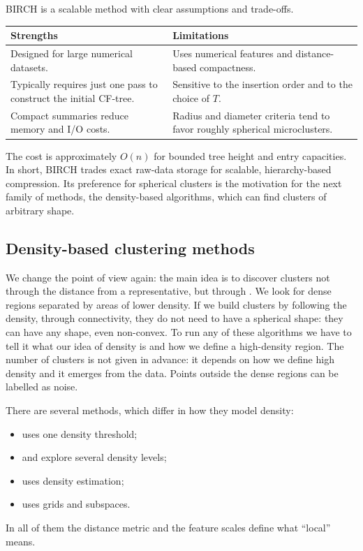 BIRCH is a scalable method with clear assumptions and trade-offs.
\begin{center}
\begin{tabular}{@{}p{7cm}p{7cm}@{}}
\toprule
Strengths & Limitations \\
\midrule
Designed for large numerical datasets. & Uses numerical features and distance-based compactness. \\
Typically requires just one pass to construct the initial CF-tree. & Sensitive to the insertion order and to the choice of $T$. \\
Compact summaries reduce memory and I/O costs. & Radius and diameter criteria tend to favor roughly spherical microclusters. \\
\bottomrule
\end{tabular}
\end{center}
The cost is approximately $O(n)$ for bounded tree height and entry capacities. In short, BIRCH trades exact raw-data storage for scalable, hierarchy-based compression. Its preference for spherical clusters is the motivation for the next family of methods, the density-based algorithms, which can find clusters of arbitrary shape.


\subsection{Density-based clustering methods}

We change the point of view again: the main idea is to discover clusters not through the distance from a representative, but through . We look for dense regions separated by areas of lower density. If we build clusters by following the density, through connectivity, they do not need to have a spherical shape: they can have any shape, even non-convex. To run any of these algorithms we have to tell it what our idea of density is and how we define a high-density region. The number of clusters is not given in advance: it depends on how we define high density and it emerges from the data. Points outside the dense regions can be labelled as noise.

There are several methods, which differ in how they model density:
\begin{itemize}
  \item {} uses one density threshold;
  \item {} and  explore several density levels;
  \item {} uses density estimation;
  \item {} uses grids and subspaces.
\end{itemize}
In all of them the distance metric and the feature scales define what ``local'' means.

